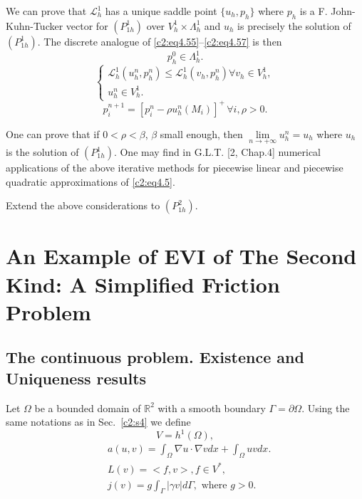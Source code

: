 We can prove that $\mathscr{L}^1_h$ has a unique saddle point $\{u_h,
p_h\}$ where $p_h$ is a F. John-Kuhn-Tucker vector for $(P^1_{1h})$
over $V^1_h \times \Lambda^1_h$ and $u_h$ is precisely the solution of
$(P^1_{1h})$. The discrete analogue of
\eqref{c2:eq4.55}--\eqref{c2:eq4.57} is then  
\begin{equation}
p^0_h \in \Lambda^1_h. \tag{4.71}\label{c2:eq4.71}
\end{equation}
\begin{equation}
\begin{cases}
\mathscr{L}^1_h (u^n_h, p^n_h) \leq \mathscr{L}^1_h (v_h, p^n_h)
\forall v_h \in V^1_h, \\ 
u^n_h \in V^1_h.\tag{4.72}\label{c2:eq4.72}
\end{cases}
\end{equation}
\begin{equation}
p^{n+1}_i = [p^n_i - \rho u^n_h (M_i)]^+\, \forall  i, \rho
>0. \tag{4.73}\label{c2:eq4.73}
\end{equation}

One can prove that if $0 < \rho < \beta$, $\beta$ small enough, then
$\displaystyle{\lim\limits_{n \to +\infty}} u^n_h = u_h$ where $u_h$ is  the solution of
$(P^1_{1h})$. One may find in G.L.T. [2, Chap.4] numerical
applications of the above iterative methods for piecewise linear and
piecewise quadratic approximations of \eqref{c2:eq4.5}. 

\begin{exercise}\label{c2:exer4.3}%
Extend  the above considerations to $(P^2_{1h})$.
\end{exercise}

\section[An Example of EVI  of The Second Kind:...]{An Example of EVI
  of The Second Kind: A Simplified Friction Problem}\label{c2:s5} 

\subsection{The continuous problem. Existence and Uniqueness
  results}\label{c2:ss5.1} \pageoriginale 

Let $\Omega$ be a bounded domain of $\mathbb{R}^2$ with a smooth
boundary $\Gamma = \partial \Omega$. Using the same notations as in
Sec.~\ref{c2:s4} we define 
\begin{equation}
V = h^1 (\Omega), \tag{5.1}\label{c2:eq5.1}
\end{equation}
\begin{align}
& a (u, v) = \int_\Omega \nabla u  \cdot \nabla v dx +
  \int_\Omega u v dx.\tag{5.2}\label{c2:eq5.2}\\ 
& L(v) = <f, v> , f \in V^*,\tag{5.3}\label{c2:eq5.3}\\
& j(v) = g \int_\Gamma | \gamma v | d \Gamma, \text{ where } g
  >0. \tag{5.4}\label{c2:eq5.4} 
\end{align}


